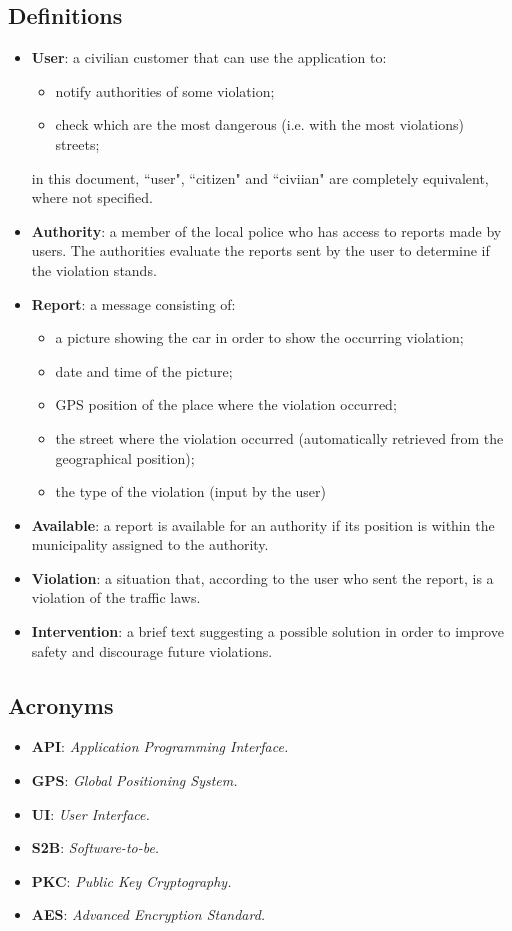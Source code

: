 \documentclass[12pt,a4paper]{report}
\begin{document}
		\subsection{Definitions}
		\begin{itemize}
		\item \textbf{User}: a civilian customer that can use the application to:
			\begin{itemize}
			\item notify authorities of some violation;
			\item check which are the most dangerous (i.e. with the most violations) streets;
			\end{itemize}
		in this document, ``user", ``citizen" and ``civiian" are completely equivalent, where not specified.
		\item \textbf{Authority}: a member of the local police who has access to reports made by users. The 					authorities evaluate the reports sent by the user to determine if the violation stands.
		\item \textbf{Report}: a message consisting of:
			\begin{itemize}
			\item a picture showing the car in order to show the occurring violation;
			\item date and time of the picture;
			\item GPS position of the place where the violation occurred;
			\item the street where the violation occurred (automatically retrieved from the geographical position);
			\item the type of the violation (input by the user)
			\end{itemize}
		\item \textbf{Available}: a report is available for an authority if its position is within the municipality assigned to the authority.
		\item \textbf{Violation}: a situation that, according to the user who sent the report, is a violation of the traffic laws.
		\item \textbf{Intervention}: a brief text suggesting a possible solution in order to improve safety and discourage future violations.
		\end{itemize}
		\subsection{Acronyms}
			\begin{itemize}
			\item \textbf{API}: \emph{Application Programming Interface.}
			\item \textbf{GPS}: \emph{Global Positioning System.}
			\item \textbf{UI}: \emph{User Interface.}		
			\item \textbf{S2B}: \emph{Software-to-be.}				
			\item \textbf{PKC}: \emph{Public Key Cryptography.}		
			\item \textbf{AES}: \emph{Advanced Encryption Standard.}		
			\end{itemize}
\end{document}
